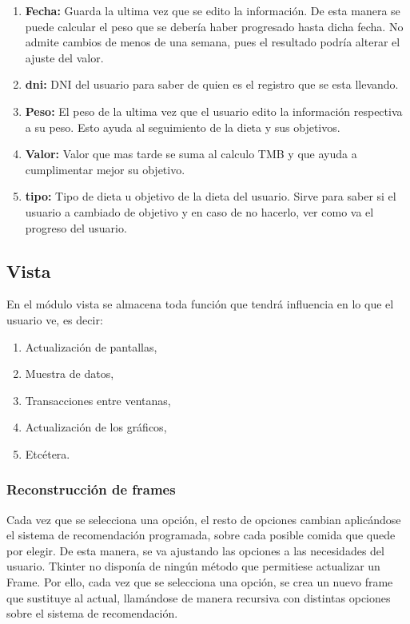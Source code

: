\begin{enumerate}
\item \textbf{Fecha:} Guarda la ultima vez que se edito la información. De esta manera se puede calcular el peso que se debería haber progresado hasta dicha fecha. No admite cambios de menos de una semana, pues el resultado podría alterar el ajuste del valor.
\item \textbf{dni:} DNI del usuario para saber de quien es el registro que se esta llevando.
\item \textbf{Peso:} El peso de la ultima vez que el usuario edito la información respectiva a su peso. Esto ayuda al seguimiento de la dieta y sus objetivos.
\item \textbf{Valor:} Valor que mas tarde se suma al calculo TMB y que ayuda a cumplimentar mejor su objetivo.
\item \textbf{tipo:} Tipo de dieta u objetivo de la dieta del usuario. Sirve para saber si el usuario a cambiado de objetivo y en caso de no hacerlo, ver como va el progreso del usuario.
\end{enumerate}

\subsection{Vista}
En el módulo vista se almacena toda función que tendrá influencia en lo que el usuario ve, es decir:
\begin{enumerate}
\item Actualización de pantallas,
\item Muestra de datos,
\item Transacciones entre ventanas,
\item Actualización de los gráficos,
\item Etcétera.
\end{enumerate} 


\subsubsection{Reconstrucción de frames}

Cada vez que se selecciona una opción, el resto de opciones cambian aplicándose el sistema de recomendación programada, sobre cada posible comida que quede por elegir. De esta manera, se va ajustando las opciones a las necesidades del usuario. Tkinter no disponía de ningún método que permitiese actualizar un Frame. Por ello, cada vez que se selecciona una opción, se crea un nuevo frame que sustituye al actual, llamándose de manera recursiva con distintas opciones sobre el sistema de recomendación.\\

